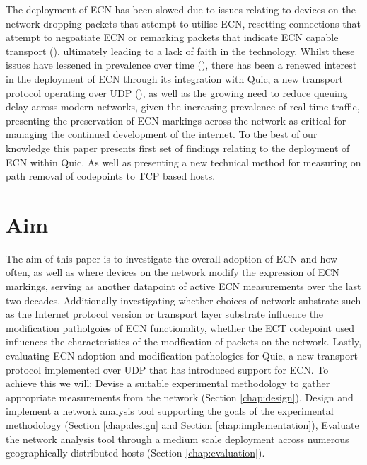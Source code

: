 \documentclass{l4proj}
\begin{document}
The deployment of ECN has been slowed due to issues relating to devices on the network dropping packets that attempt to utilise ECN, resetting connections that attempt to negoatiate ECN or remarking packets that indicate ECN capable transport (\cite{floyd_inappropriate_2002}), ultimately leading to a lack of faith in the technology. Whilst these issues have lessened in prevalence over time (\cite{trammell_enabling_2015}), there has been a renewed interest in the deployment of ECN through its integration with Quic, a new transport protocol operating over UDP (\cite{johansson_ecn_2017}), as well as the growing need to reduce queuing delay across modern networks, given the increasing prevalence of real time traffic, presenting the preservation of ECN markings across the network as critical for managing the continued development of the internet. To the best of our knowledge this paper presents first set of findings relating to the deployment of ECN within Quic. As well as presenting a new technical method for measuring on path removal of codepoints to TCP based hosts.

\section{Aim}

The aim of this paper is to investigate the overall adoption of ECN and how often, as well as where devices on the network modify the expression of ECN markings, serving as another datapoint of active ECN measurements over the last two decades. Additionally investigating whether choices of network substrate such as the Internet protocol version or transport layer substrate influence the modification patholgoies of ECN functionality, whether the ECT codepoint used influences the characteristics of the modfication of packets on the network. Lastly, evaluating ECN adoption and modification pathologies for Quic, a  new transport protocol implemented over UDP that has introduced support for ECN. To achieve this we will; Devise a suitable experimental methodology to gather appropriate measurements from the network (Section \ref{chap:design}), Design and implement a network analysis tool supporting the goals of the experimental methodology (Section \ref{chap:design} and Section \ref{chap:implementation}), Evaluate the network analysis tool through a medium scale deployment across numerous geographically distributed hosts (Section \ref{chap:evaluation}).

\clearpage


\end{document}
